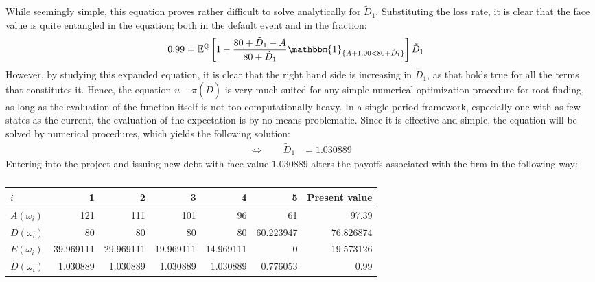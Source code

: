 \documentclass[main.tex]{subfiles}
\begin{document}
        While seemingly simple, this equation proves rather difficult to solve analytically for $\tilde{D}_{1}$.
        Substituting the loss rate, it is clear that the face value is quite entangled in the equation;
        both in the default event and in the fraction:
            \begin{align*}
                \num{0.99}
                &= 
                \mathbb{E}^{\rnmeasure}\left[
                    1 
                    - 
                    \frac{
                        \num{80} + \tilde{D}_{1} - A
                    }{
                        \num{80} + \tilde{D}_{1}
                    }
                    \mathbbm{1}_{\{A + 1.00 < \num{80} + \tilde{D}_{1}\}} 
                \right] 
                \tilde{D}_{1} 
            \end{align*}
        However, by studying this expanded equation, it is clear that the right hand side 
        is increasing in $\tilde{D}_{1}$, as that holds true for all the terms that constitutes it.
        Hence, the equation $u - \pi(\tilde{D})$ is very much suited for any simple numerical optimization procedure
        for root finding, as long as the evaluation of the function itself is not too computationally heavy.
        In a single-period framework, especially one with as few states as the current,
        the evaluation of the expectation is by no means problematic.
        Since it is effective and simple, the equation will be solved by numerical procedures, 
        which yields the following solution:
            \begin{align*}
                \Leftrightarrow  \qquad
                \tilde{D}_{1} &= \num{1.030889}
            \end{align*}
        Entering into the project and issuing new debt with face value $\num{1.030889}$ 
        alters the payoffs associated with the firm in the following way:
        \begin{table}[H]
            \centering
            \begin{tabular}{l|rrrrr||r}
                $i$ & 1 & 2 & 3 & 4 & 5 & Present value \\
                \hline
                $A(\omega_{i})$ 
                    & \num{121} & \num{111} & \num{101} & \num{96} & \num{61} & \num{97.39} \\
                $D(\omega_{i})$ 
                    & \num{80} & \num{80} & \num{80} & \num{80} & \num{60.223947} & \num{76.826874} \\
                $E(\omega_{i})$ 
                    & \num{39.969111} & \num{29.969111} & \num{19.969111} & \num{14.969111} & \num{0} & \num{19.573126} \\
                $\tilde{D}(\omega_{i})$ 
                    & \num{1.030889} & \num{1.030889} & \num{1.030889} & \num{1.030889} & \num{0.776053} & \num{0.99} \\
            \end{tabular}
            \caption{}
        \end{table}
\end{document}
